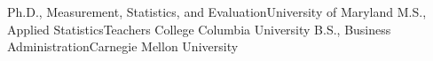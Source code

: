 %
%
%

\begin{scholarship}
	{Ph.D., Measurement, Statistics, and Evaluation}{University of Maryland}
	{M.S., Applied Statistics}{Teachers College Columbia University}
	{B.S., Business Administration}{Carnegie Mellon University}

\end{scholarship}
